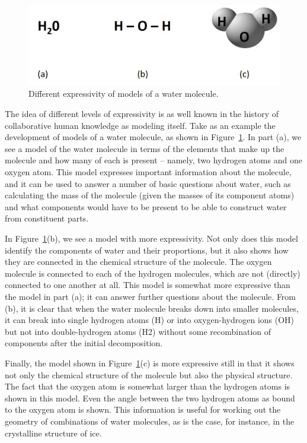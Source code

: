 \begin{figure}
    \centering
    \includegraphics[width=5.0in]{media/ch2/figure-02-04.jpg}
    \caption{Different expressivity of models of a water molecule.}
    \label{fig:ch2.4}
\end{figure}


The idea of different levels of expressivity is as well known in the
history of collaborative human knowledge as modeling itself. Take as an
example the development of models of a water molecule, as shown in Figure~\ref{fig:ch2.4}. In part (a), we see a model of the water molecule
in terms of the elements that make up the molecule and how many of each
is present -- namely, two hydrogen atoms and one oxygen atom. This model
expresses important information about the molecule, and it can be used
to answer a number of basic questions about water, such as calculating
the mass of the molecule (given the masses of its component atoms) and
what components would have to be present to be able to construct water
from constituent parts.

In Figure~\ref{fig:ch2.4}(b), we see a model with more expressivity. Not only does
this model identify the components of water and their proportions, but
it also shows how they are connected in the chemical structure of the
molecule. The oxygen molecule is connected to each of the hydrogen
molecules, which are not (directly) connected to one another at all.
This model is somewhat more expressive than the model in part (a); it
can answer further questions about the molecule. From (b), it is clear
that when the water molecule breaks down into smaller molecules, it can
break into single hydrogen atoms (H) or into oxygen-hydrogen ions (OH)
but not into double-hydrogen atoms (H2) without some recombination of
components after the initial decomposition.

Finally, the model shown in Figure~\ref{fig:ch2.4}(c) is more expressive still in
that it shows not only the chemical structure of the molecule but also
the physical structure. The fact that the oxygen atom is somewhat larger
than the hydrogen atoms is shown in this model. Even the angle between
the two hydrogen atoms as bound to the oxygen atom is shown. This
information is useful for working out the geometry of combinations of
water molecules, as is the case, for instance, in the crystalline
structure of ice.

